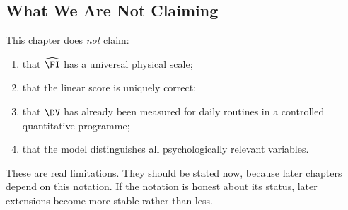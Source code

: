 \subsection{What We Are Not Claiming}

This chapter does \emph{not} claim:
\begin{enumerate}[nosep]
  \item that $\widehat{\FI}$ has a universal physical scale;
  \item that the linear score is uniquely correct;
  \item that $\DV$ has already been measured for daily routines in a controlled
        quantitative programme;
  \item that the model distinguishes all psychologically relevant variables.
\end{enumerate}

These are real limitations. They should be stated now, because later chapters
depend on this notation. If the notation is honest about its status, later
extensions become more stable rather than less.
